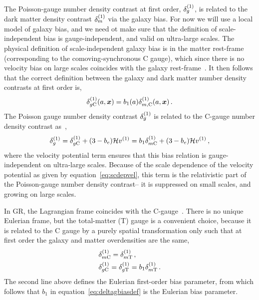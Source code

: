 The Poisson-gauge number density contrast at first order, $\delta_g^{(1)}$, is related to the dark matter density contrast $\delta_m^{(1)}$ via the galaxy bias. For now we will use a local model of galaxy bias, and we need ot make sure that the definition of scale-independent bias is gauge-independent, and valid on ultra-large scales. The physical definition of scale-independent galaxy bias is in the matter rest-frame (corresponding to the comoving-synchronous C gauge), which since there is no velocity bias on large scales coincides with the galaxy rest-frame~\cite{Challinor:2011bk,Bruni:2011ta,Jeong:2011as}. It then follows that the correct definition between the galaxy and dark matter number density contrasts at first order is, 
\begin{equation}\label{eq:deltagbiasdef}
	\delta_{g\mathrm{C}}^{(1)} (a, \bm {x}) = b_1(a) \delta_{m,\mathrm{C}}^{(1)}(a,\bm {x})\,.
\end{equation}
The Poisson gauge number density contrast $\delta_g^{(1)}$ is related to the C-gauge number density contrast as~\cite{Challinor:2011bk}, 
\begin{equation}\label{eq:deltagFOPgtoCg}
	\delta_{g}^{(1)} = \delta_{g\mathrm{C}}^{(1)} + (3 - b_e)\mathcal{H} v^{(1)} = b_1 \delta_{m\mathrm{C}}^{(1)} + (3 - b_e) \mathcal{H} v^{(1)}\,,
\end{equation}
where the velocity potential term ensures that this bias relation is gauge-independent on ultra-large scales. Because of the scale dependence of the velocity potential as given by equation~\eqref{eq:scdepvel}, this term is the relativistic part of the Poisson-gauge number density contrast-- it is suppressed on small scales, and growing on large scales. 

In GR, the Lagrangian frame coincides with the C-gauge~\cite{Villa:2015ppa,Bertacca:2015mca}. There is no unique Eulerian frame, but the total-matter (T) gauge is a convenient choice, because it is related to the C gauge by a purely spatial transformation only such that at first order the galaxy and matter overdensities are the same,~\cite{Bertacca:2015mca}
\begin{align}\label{eq:deltaFOCgtoTg}
	&\delta^{(1)}_{m\mathrm{C}} = \delta^{(1)}_{m\mathrm{T}}\,,\\
	&\delta^{(1)}_{g\mathrm{C}} = \delta^{(1)}_{g\mathrm{T}} = b_1 \delta^{(1)}_{m\mathrm{T}}\,.
\end{align}
The second line above defines the Eulerian first-order bias parameter, from which follows that $b_1$ in equation~\eqref{eq:deltagbiasdef} is the Eulerian bias parameter.

